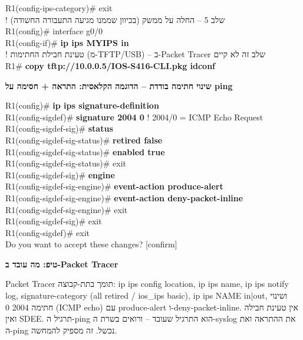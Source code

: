 \documentclass[11pt]{article}
\newcommand{\enLR}[1]{\textenglish{#1}}
\newcommand{\code}[1]{\textenglish{\codefont #1}}
\newcommand{\subheading}[1]{\vskip6pt{\bfseries\color{h3}#1\par}\vskip2pt}
\newcommand{\boxtitle}[1]{{\bfseries\color{boxti}#1}}
\newenvironment{tipbox}{\colorlet{boxti}{tipti}\begin{mdframed}[backgroundcolor=tipbg,linecolor=tipfr,rightline=true,leftline=false,topline=false,bottomline=false,linewidth=2pt,innertopmargin=6pt,innerbottommargin=6pt,innerleftmargin=8pt,innerrightmargin=8pt,skipabove=6pt,skipbelow=6pt]}{\end{mdframed}}
\begin{document}
\begin{codebox}
\begin{english}
R1(config-ips-category)\# exit\\
\textcolor{ccom}{\texthebrew{! שלב \enLR{5} – החלה על ממשק (בכיוון שממנו מגיעה התעבורה החשודה)}}\\
R1(config)\# interface g0/0\\
R1(config-if)\# \textcolor{cbold}{\textbf{ip ips MYIPS in}}\\
\textcolor{ccom}{\texthebrew{! טעינת חבילת החתימות (מ-\enLR{TFTP/USB)} – ב-\enLR{Packet Tracer} שלב זה לא קיים}}\\
R1\# \textcolor{cbold}{\textbf{copy tftp://10.0.0.5/IOS-S416-CLI.pkg idconf}}
\end{english}\end{codebox}

\subheading{שינוי חתימה בודדת – הדוגמה הקלאסית: התראה + חסימה על \enLR{ping}}

\begin{codebox}\begin{english}\codefont\footnotesize\color{cfg}\setlength{\parindent}{0pt}
R1(config)\# \textcolor{cbold}{\textbf{ip ips signature-definition}}\\
R1(config-sigdef)\# \textcolor{cbold}{\textbf{signature 2004 0}}           \textcolor{ccom}{\texthebrew{! \enLR{2004/0 = ICMP Echo Request}}}\\
R1(config-sigdef-sig)\# \textcolor{cbold}{\textbf{status}}\\
R1(config-sigdef-sig-status)\# \textcolor{cbold}{\textbf{retired false}}\\
R1(config-sigdef-sig-status)\# \textcolor{cbold}{\textbf{enabled true}}\\
R1(config-sigdef-sig-status)\# exit\\
R1(config-sigdef-sig)\# \textcolor{cbold}{\textbf{engine}}\\
R1(config-sigdef-sig-engine)\# \textcolor{cbold}{\textbf{event-action produce-alert}}\\
R1(config-sigdef-sig-engine)\# \textcolor{cbold}{\textbf{event-action deny-packet-inline}}\\
R1(config-sigdef-sig-engine)\# exit\\
R1(config-sigdef-sig)\# exit\\
R1(config-sigdef)\# exit\\
Do you want to accept these changes? [confirm]
\end{english}\end{codebox}

\begin{tipbox}\boxtitle{טיפ: מה עובד ב-\enLR{Packet Tracer}}\par  \enLR{Packet Tracer} תומך בתת-קבוצה: \code{ip ips config location}, \code{ip ips name}, \code{ip ips notify log}, \code{signature-category} \enLR{(all retired / ios\_ips basic)}, \code{ip ips NAME in|out}, ושינוי חתימה \enLR{2004 0 (ICMP echo)} עם \enLR{produce-alert} ו-\enLR{deny-packet-inline.} אין טעינת חבילה ואין \enLR{SDEE.} תרגיל ה-\enLR{ping} הוא התרגיל שעובד – ורואים בשרת ה-\enLR{syslog} את ההתראה ואת ה-\enLR{ping} נכשל. זה מספיק להמחשה.\end{tipbox}
\end{document}
